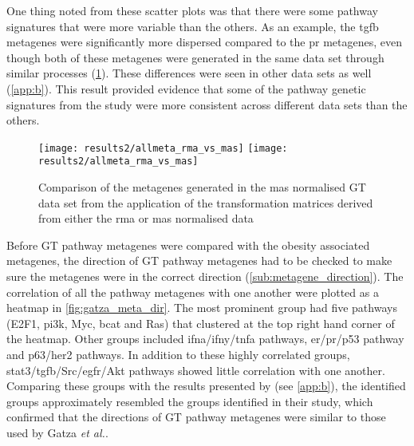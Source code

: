 One thing noted from these scatter plots was that there were some pathway signatures that were more variable than the others.
As an example, the \gls{tgfb} metagenes were significantly more dispersed compared to the \gls{pr} metagenes, even though both of these metagenes were generated in the same data set through similar processes (\cref{fig:gt_rma_vs_mas}).
These differences were seen in other data sets as well (\cref{app:b}).
This result provided evidence that some of the pathway genetic signatures from the \citet{Gatza2010a} study were more consistent across different data sets than the others.
\\

\begin{figure}[htpb]
	\centering
	\texttt{[image: results2/allmeta\_rma\_vs\_mas]}
	\texttt{[image: results2/allmeta\_rma\_vs\_mas]}
	\caption{Comparison of the metagenes generated in the \gls{mas} normalised GT data set from the application of the transformation matrices derived from either the \gls{rma} or \gls{mas} normalised data}
	\label{fig:gt_rma_vs_mas}
\end{figure}

\noindent
Before GT pathway metagenes were compared with the obesity associated metagenes, the direction of GT pathway metagenes had to be checked to make sure the metagenes were in the correct direction (\cref{sub:metagene_direction}).
The correlation of all the pathway metagenes with one another were plotted as a heatmap in \cref{fig:gatza_meta_dir}.
The most prominent group had five pathways (E2F1, \gls{pi3k}, Myc, \gls{bcat} and Ras) that clustered at the top right hand corner of the heatmap.
Other groups included \gls{ifna}/\gls{ifny}/\gls{tnfa} pathways, \gls{er}/\gls{pr}/p53 pathway and p63/\gls{her2} pathways.
In addition to these highly correlated groups, \gls{stat3}/\gls{tgfb}/Src/\gls{egfr}/Akt pathways showed little correlation with one another.
Comparing these groups with the results presented by \citet{Gatza2010a} (see \cref{app:b}), the identified groups approximately resembled the groups identified in their study, which confirmed that the directions of GT pathway metagenes were similar to those used by Gatza \textit{et al.}.

